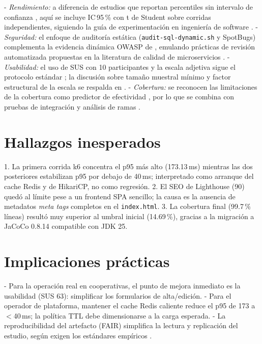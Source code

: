 - \emph{Rendimiento:} a diferencia de estudios que reportan percentiles sin
  intervalo de confianza \cite{jiang2009}, aquí se incluye IC\,95\,\% con t de
  Student sobre corridas independientes, siguiendo la guía de experimentación en
  ingeniería de software \cite{wohlin2012}.
- \emph{Seguridad:} el enfoque de auditoría estática (\texttt{audit-sql-dynamic.sh}
  y SpotBugs) complementa la evidencia dinámica OWASP de \cite{owasp2021},
  emulando prácticas de revisión automatizada propuestas en la literatura de
  calidad de microservicios \cite{taibi2018}.
- \emph{Usabilidad:} el uso de SUS con 10 participantes y la escala adjetiva sigue
  el protocolo estándar \cite{brooke1996,bangor2009}; la discusión sobre tamaño
  muestral mínimo y factor estructural de la escala se respalda en \cite{lewis2009}.
- \emph{Cobertura:} se reconocen las limitaciones de la cobertura como predictor
  de efectividad \cite{inozemtseva2014}, por lo que se combina con pruebas de
  integración y análisis de ramas \cite{gopinath2014,gligoric2013,ivankovic2019}.

\section{Hallazgos inesperados}

1. La primera corrida k6 concentra el p95 más alto (173.13\,ms) mientras las dos
   posteriores estabilizan p95 por debajo de 40\,ms; interpretado como arranque del
   cache Redis y de HikariCP, no como regresión.
2. El SEO de Lighthouse (90) quedó al límite pese a un frontend SPA sencillo; la
   causa es la ausencia de metadatos \emph{meta tags} completos en el \texttt{index.html}.
3. La cobertura final (99.7\,\% líneas) resultó muy superior al umbral inicial
   (14.69\,\%), gracias a la migración a JaCoCo 0.8.14 compatible con JDK 25.

\section{Implicaciones prácticas}

- Para la operación real en cooperativas, el punto de mejora inmediato es la
  usabilidad (SUS 63): simplificar los formularios de alta/edición.
- Para el operador de plataforma, mantener el cache Redis caliente reduce el p95
  de 173 a $<$40\,ms; la política TTL debe dimensionarse a la carga esperada.
- La reproducibilidad del artefacto (FAIR) simplifica la lectura y replicación del
  estudio, según exigen los estándares empíricos \cite{ralph2021,prisma2021}.